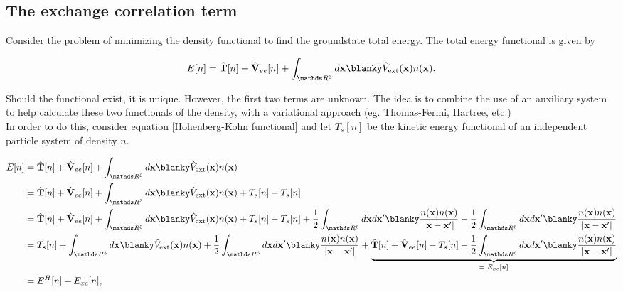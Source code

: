 \documentclass{homework}
\begin{document}
\subsection{The exchange correlation term}

Consider the problem of minimizing the density functional to find the groundstate total energy. The total energy functional is given by 

\begin{equation}
 E[n] = \hat{\bf T}[n] + \hat{\bf V}_{ee}[n] + \int_{\R^3} d{\bf x} \blanky \hat{V}_{\textnormal{ext}}({\bf x}) n({\bf x}).
 \label{Hohenberg-Kohn functional}
\end{equation}

Should the functional exist, it is unique. However, the first two terms are unknown. The idea is to combine the use of an auxiliary system to help calculate these two functionals of the density, with a variational approach (eg. Thomas-Fermi, Hartree, etc.) \\

In order to do this, consider equation \eqref{Hohenberg-Kohn functional} and let $T_s[n]$ be the kinetic energy functional of an independent particle system of density $n$. 

\begin{align*}
     E[n] &= \hat{\bf T}[n] + \hat{\bf V}_{ee}[n] + \int_{\R^3} d{\bf x} \blanky \hat{V}_{\textnormal{ext}}({\bf x}) n({\bf x}) \\
     &= \hat{\bf T}[n] + \hat{\bf V}_{ee}[n] + \int_{\R^3} d{\bf x} \blanky \hat{V}_{\textnormal{ext}}({\bf x}) n({\bf x}) + T_s[n]-T_s[n] \\
     &= \hat{\bf T}[n] + \hat{\bf V}_{ee}[n] + \int_{\R^3} d{\bf x} \blanky \hat{V}_{\textnormal{ext}}({\bf x}) n({\bf x}) + T_s[n]-T_s[n] + \frac{1}{2} \int_{\R^6} d{\bf x} d{\bf x'} \blanky \frac{n({\bf x})n({\bf x})}{|{\bf x}-{\bf x'}|} - \frac{1}{2} \int_{\R^6} d{\bf x} d{\bf x'} \blanky \frac{n({\bf x})n({\bf x})}{|{\bf x}-{\bf x'}|} \\
     &= T_s[n] + \int_{\R^3} d{\bf x} \blanky \hat{V}_{\textnormal{ext}}({\bf x}) n({\bf x}) + \frac{1}{2} \int_{\R^6} d{\bf x} d{\bf x'} \blanky \frac{n({\bf x})n({\bf x})}{|{\bf x}-{\bf x'}|} + \underbrace{\hat{\bf T}[n] + \hat{\bf V}_{ee}[n] - T_s[n] - \frac{1}{2} \int_{\R^6} d{\bf x} d{\bf x'} \blanky \frac{n({\bf x})n({\bf x})}{|{\bf x}-{\bf x'}|}}_{\text{$=E_{xc}[n]$}} \\
     &= E^H [n] + E_{xc}[n],
\end{align*}
\end{document}
